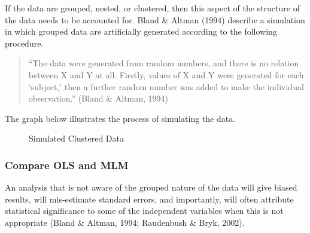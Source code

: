 \documentclass[
  letterpaper,
  DIV=11,
  numbers=noendperiod]{scrreprt}
\begin{document}
If the data are grouped, nested, or clustered, then this aspect of the
structure of the data needs to be accounted for. Bland \& Altman (1994)
describe a simulation in which grouped data are artificially generated
according to the following procedure. 

\begin{quote}
``The data were generated from random numbers, and there is no relation
between X and Y at all. Firstly, values of X and Y were generated for
each `subject,' then a further random number was added to make the
individual observation.'' (Bland \& Altman, 1994)
\end{quote}

The graph below illustrates the process of simulating the data.

\begin{figure}


\caption{\label{fig-simulatedclustereddata}Simulated Clustered Data}

\end{figure}%

\subsubsection{Compare OLS and MLM}\label{compare-ols-and-mlm}

An analysis that is not aware of the grouped nature of the data will
give biased results, will mis-estimate standard errors, and importantly,
will often attribute statistical significance to some of the independent
variables when this is not appropriate (Bland \& Altman, 1994;
Raudenbush \& Bryk, 2002). 
\end{document}
